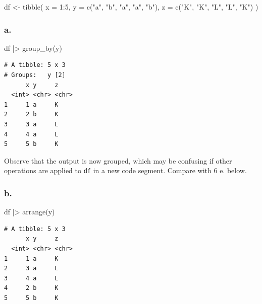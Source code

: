 \documentclass[
  letterpaper,
  DIV=11,
  numbers=noendperiod]{scrreprt}
\newenvironment{Shaded}{\begin{snugshade}}{\end{snugshade}}
\newcommand{\AttributeTok}[1]{\textcolor[rgb]{0.40,0.45,0.13}{#1}}
\newcommand{\DecValTok}[1]{\textcolor[rgb]{0.68,0.00,0.00}{#1}}
\newcommand{\FunctionTok}[1]{\textcolor[rgb]{0.28,0.35,0.67}{#1}}
\newcommand{\NormalTok}[1]{\textcolor[rgb]{0.00,0.23,0.31}{#1}}
\newcommand{\OtherTok}[1]{\textcolor[rgb]{0.00,0.23,0.31}{#1}}
\newcommand{\SpecialCharTok}[1]{\textcolor[rgb]{0.37,0.37,0.37}{#1}}
\newcommand{\StringTok}[1]{\textcolor[rgb]{0.13,0.47,0.30}{#1}}
\begin{document}
\begin{Shaded}
\begin{Highlighting}[]
\NormalTok{df }\OtherTok{\textless{}{-}} \FunctionTok{tibble}\NormalTok{(}
  \AttributeTok{x =} \DecValTok{1}\SpecialCharTok{:}\DecValTok{5}\NormalTok{,}
  \AttributeTok{y =} \FunctionTok{c}\NormalTok{(}\StringTok{"a"}\NormalTok{, }\StringTok{"b"}\NormalTok{, }\StringTok{"a"}\NormalTok{, }\StringTok{"a"}\NormalTok{, }\StringTok{"b"}\NormalTok{),}
  \AttributeTok{z =} \FunctionTok{c}\NormalTok{(}\StringTok{"K"}\NormalTok{, }\StringTok{"K"}\NormalTok{, }\StringTok{"L"}\NormalTok{, }\StringTok{"L"}\NormalTok{, }\StringTok{"K"}\NormalTok{)}
\NormalTok{)}
\end{Highlighting}
\end{Shaded}

\subsubsection{a.}\label{a.}

\begin{Shaded}
\begin{Highlighting}[]
\NormalTok{df }\SpecialCharTok{|\textgreater{}}
  \FunctionTok{group\_by}\NormalTok{(y)}
\end{Highlighting}
\end{Shaded}

\begin{verbatim}
# A tibble: 5 x 3
# Groups:   y [2]
      x y     z    
  <int> <chr> <chr>
1     1 a     K    
2     2 b     K    
3     3 a     L    
4     4 a     L    
5     5 b     K    
\end{verbatim}

Observe that the output is now grouped, which may be confusing if other
operations are applied to \texttt{df} in a new code segment. Compare
with 6 e. below.

\subsubsection{b.}\label{b.}

\begin{Shaded}
\begin{Highlighting}[]
\NormalTok{df }\SpecialCharTok{|\textgreater{}}
  \FunctionTok{arrange}\NormalTok{(y)}
\end{Highlighting}
\end{Shaded}

\begin{verbatim}
# A tibble: 5 x 3
      x y     z    
  <int> <chr> <chr>
1     1 a     K    
2     3 a     L    
3     4 a     L    
4     2 b     K    
5     5 b     K    
\end{verbatim}
\end{document}
